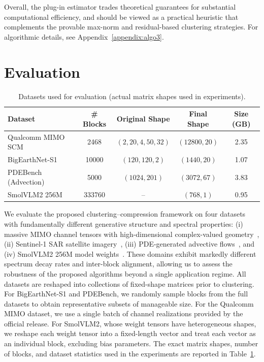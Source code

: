 \documentclass[10pt]{article} %
\begin{document}
Overall, the plug-in estimator trades theoretical guarantees for substantial
computational efficiency, and should be viewed as a practical heuristic that
complements the provable max-norm and residual-based clustering strategies.
For algorithmic details, see Appendix~\ref{appendix:algo3}.


\section{Evaluation}
\label{sec:evaluation}

\begin{table}[h]
\centering
\begin{tabular}{lcccc}
\toprule
Dataset & \# Blocks & Original Shape & Final Shape & Size (GB) \\ 
\midrule
Qualcomm MIMO SCM & 2468 & $(2,20,4,50,32)$ & $(12800,20)$ & 2.35 \\
BigEarthNet-S1 & 10000 & $(120,120,2)$ & $(1440,20)$ & 1.07 \\
PDEBench (Advection) & 5000 & $(1024,201)$ & $(3072,67)$ & 3.83 \\
SmolVLM2 256M & 333760 & {--} & $(768, 1)$ & 0.95 \\
\bottomrule
\end{tabular}
\caption{Datasets used for evaluation (actual matrix shapes used in experiments).}
\label{tab:data-overview}
\end{table}

We evaluate the proposed clustering--compression framework on four datasets with fundamentally different generative structure and spectral properties: 
(i) massive MIMO channel tensors with high-dimensional complex-valued geometry~\citep{qualcomm2025mimo}, 
(ii) Sentinel-1 SAR satellite imagery~\citep{clasen2025reben}, 
(iii) PDE-generated advective flows~\citep{takamoto2022pdebench}, and 
(iv) SmolVLM2 256M model weights~\citep{marafioti2025smolvlm}. 
These domains exhibit markedly different spectrum decay rates and inter-block alignment, allowing us to assess the robustness of the proposed algorithms beyond a single application regime. All datasets are reshaped into collections of fixed-shape matrices prior to clustering. 
For BigEarthNet-S1 and PDEBench, we randomly sample blocks from the full datasets to obtain representative subsets of manageable size. 
For the Qualcomm MIMO dataset, we use a single batch of channel realizations provided by the official release. 
For SmolVLM2, whose weight tensors have heterogeneous shapes, we reshape each weight tensor into a fixed-length vector and treat each vector as an individual block, excluding bias parameters. 
The exact matrix shapes, number of blocks, and dataset statistics used in the experiments are reported in Table~\ref{tab:data-overview}.
\end{document}
